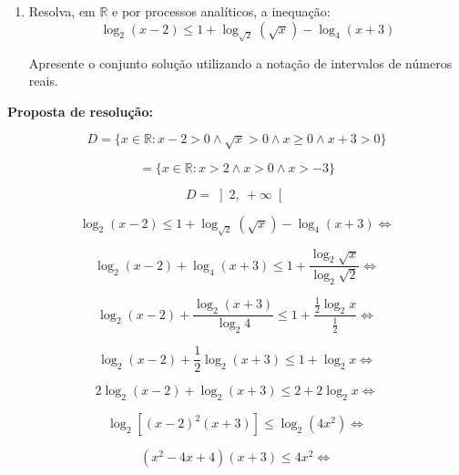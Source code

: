 \documentclass{article}
\begin{document}
    \begin{enumerate}
        \item Resolva, em $\mathbb{R}$ e por processos analíticos, a inequação:
        \[\log_2 \left(x-2\right)\leq1+\log_{\sqrt{2}}\left(\sqrt{x}\right)-\log_4 \left(x+3\right)\]

        Apresente o conjunto solução utilizando a notação de intervalos de números reais.
    \end{enumerate}


    \bigskip
    \textbf{Proposta de resolução:}

    \[D=\{x\in\mathbb{R}: x-2>0 \land \sqrt{x}>0 \land x\geq0 \land x+3>0\}\]

    \[=\{x\in\mathbb{R}: x>2 \land x>0 \land x>-3\}\]

    \begin{center}
    \end{center}

    \[D=\left]2,~+\infty\right[\]

    \begin{center}        
    \end{center}

    \[\log_2 \left(x-2\right)\leq1+\log_{\sqrt{2}}\left(\sqrt{x}\right)-\log_4 \left(x+3\right)\Leftrightarrow\]

    \[\log_2 \left(x-2\right)+\log_4 \left(x+3\right)\leq1+\dfrac{\log_2 \sqrt{x}}{\log_2 \sqrt{2}}\Leftrightarrow\]

    \[\log_2 \left(x-2\right)+\dfrac{\log_2 \left(x+3\right)}{\log_2 4}\leq1+\dfrac{\frac{1}{2} \log_2 x}{\frac{1}{2}}\Leftrightarrow\]

    \[\log_2 \left(x-2\right)+\frac{1}{2}\log_2\left(x+3\right)\leq1+\log_2 x\Leftrightarrow\]

    \[2\log_2 \left(x-2\right)+\log_2\left(x+3\right)\leq2+2\log_2 x\Leftrightarrow\]

    \[\log_2 \left[\left(x-2\right)^2\left(x+3\right)\right]\leq\log_2\left(4x^2\right)\Leftrightarrow\]

    \[\left(x^2-4x+4\right)\left(x+3\right)\leq 4x^2\Leftrightarrow\]
\end{document}
